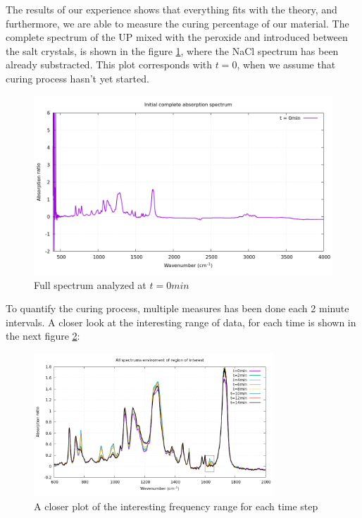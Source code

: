 The results of our experience shows that everything fits with the theory, and
furthermore, we are able to measure the curing percentage of our material. The complete
spectrum of the UP mixed with the peroxide and introduced between the salt crystals,
is shown in the figure \ref{fig:plot_full}, where the NaCl spectrum has been already
substracted. This plot corresponds with $t=0$, when we assume that curing process
hasn't yet started.\\

\begin{figure}[h]
	\centering
	\includegraphics[width=\textwidth]{img/complete_spectrum.png}
	\caption{Full spectrum analyzed at $t = 0min$}
	\label{fig:plot_full}
\end{figure}

To quantify the curing process, multiple measures has been done each 2 minute intervals.
A closer look at the interesting range of data, for each time is shown in the next figure
\ref{fig:plot_full_zoom}:

\begin{figure}[h]
	\centering
	\includegraphics[width=0.8\textwidth]{img/complete_spectrum_zoom.png}
	\caption{A closer plot of the interesting frequency range for each time step}
	\label{fig:plot_full_zoom}
\end{figure}


